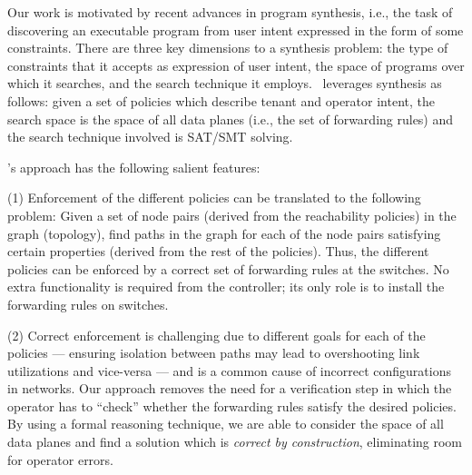   Our work is motivated by recent advances in program synthesis, i.e.,
  the task of discovering an executable program from user intent
  expressed in the form of some constraints. There are three key
  dimensions to a synthesis problem: the type of constraints that it
  accepts as expression of user intent, the space of programs over
  which it searches, and the search technique it employs.
  \Name\ leverages synthesis as follows: given a set of
  policies which describe tenant and operator intent, the
  search space is the space of all data planes (i.e., the set of
  forwarding rules) and the search technique involved is SAT/SMT
  solving.

\Name's approach has the following salient features:

(1) Enforcement of the different policies can be translated
to the following problem: Given a set of node pairs (derived from the
reachability policies) in the graph (topology), find paths in the
graph for each of the node pairs satisfying certain properties
(derived from the rest of the policies).  Thus, the
different policies can be enforced by a correct set of
forwarding rules at the switches.  No extra functionality is required
from the controller; its only role is to install the forwarding rules
on switches.



(2) Correct enforcement is challenging due to different goals for each
of the policies --- ensuring isolation between paths may
lead to overshooting link utilizations and vice-versa --- and is a
common cause of incorrect configurations in networks.  Our approach
removes the need for a verification step in which the operator has to
``check'' whether the forwarding rules satisfy the desired
policies.  By using a formal reasoning technique, we are
able to consider the space of all data planes and find a solution
which is \emph{correct by construction}, eliminating room for operator
errors.



